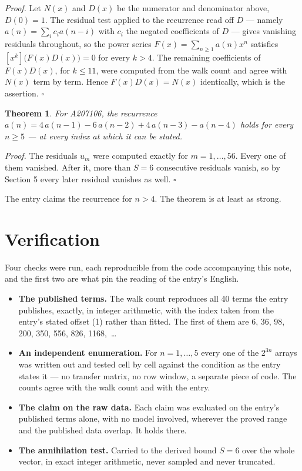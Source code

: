 \documentclass[11pt]{article}
\newtheorem{theorem}{Theorem}
\theoremstyle{definition}
\begin{document}
{\itshape Proof.} Let $N(x)$ and $D(x)$ be the numerator and denominator above, $D(0)=1$. The residual test applied to the recurrence read off $D$ --- namely $a(n) = \sum_i c_i a(n-i)$ with $c_i$ the negated coefficients of $D$ --- gives vanishing residuals throughout, so the power series $F(x)=\sum_{n\ge 1}a(n)x^n$ satisfies $[x^k]\bigl(F(x)D(x)\bigr) = 0$ for every $k > 4$. The remaining coefficients of $F(x)D(x)$, for $k \le 11$, were computed from the walk count and agree with $N(x)$ term by term. Hence $F(x)D(x) = N(x)$ identically, which is the assertion. $\square$

\begin{theorem} For A207106, the recurrence $a(n) = 4\,a(n-1) - 6\,a(n-2) + 4\,a(n-3) - a(n-4)$ holds for every $n \ge 5$ --- at every index at which it can be stated.\end{theorem}

{\itshape Proof.} The residuals $u_m$ were computed exactly for $m = 1,\dots,56$. Every one of them vanished. After it, more than $S = 6$ consecutive residuals vanish, so by Section 5 every later residual vanishes as well. $\square$

The entry claims the recurrence for $n > 4$. The theorem is at least as strong.

\section{Verification}

Four checks were run, each reproducible from the code accompanying this note, and the first two are what pin the reading of the entry's English.

\begin{itemize}

\item {\bfseries The published terms.} The walk count reproduces all 40 terms the entry publishes, exactly, in integer arithmetic, with the index taken from the entry's stated offset (1) rather than fitted. The first of them are 6, 36, 98, 200, 350, 556, 826, 1168,~\dots

\item {\bfseries An independent enumeration.} For $n = 1,\dots,5$ every one of the $2^{3n}$ arrays was written out and tested cell by cell against the condition as the entry states it --- no transfer matrix, no row window, a separate piece of code. The counts agree with the walk count and with the entry.

\item {\bfseries The claim on the raw data.} Each claim was evaluated on the entry's published terms alone, with no model involved, wherever the proved range and the published data overlap. It holds there.

\item {\bfseries The annihilation test.} Carried to the derived bound $S = 6$ over the whole vector, in exact integer arithmetic, never sampled and never truncated.

\end{itemize}
\end{document}
